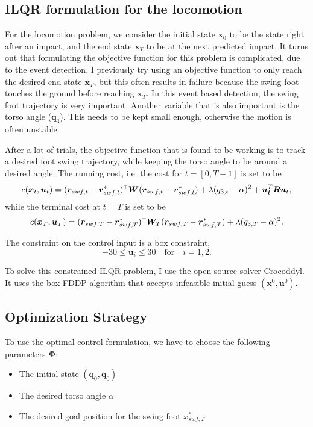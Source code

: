 \subsection{ILQR formulation for the locomotion}
For the locomotion problem, we consider the initial state $\bm{x}_0$ to be the state right after an impact, and the end state $\bm{x}_T$ to be at the next predicted impact. It turns out that formulating the objective function for this problem is complicated, due to the event detection. I previously try using an objective function to only reach the desired end state $\bm{x}_T$, but this often results in failure because the swing foot touches the ground before reaching $\bm{x}_T$. In this event based detection, the swing foot trajectory is very important. Another variable that is also important is the torso angle ($\bm{q}_3$). This needs to be kept small enough, otherwise the motion is often unstable. 

After a lot of trials, the objective function that is found to be working is to track a desired foot swing trajectory, while keeping the torso angle to be around a desired angle. The running cost, i.e. the cost for $t = [0, T-1] $ is set to be
\begin{equation}
c(\bm{x}_t, \bm{u}_t) = (\bm{r}_{swf, t} - \bm{r}_{swf, t}^*)^{\scriptscriptstyle\top} \bm{W} (\bm{r}_{swf,t} - \bm{r}_{swf, t}^*) + \lambda (q_{3,t} - \alpha)^2 +  \bm{u_t}^T \bm{R} \bm{u}_t,
\end{equation}
while the terminal cost at $t = T$ is set to be 
\begin{equation}
c(\bm{x}_T, \bm{u}_T) = (\bm{r}_{swf, T} - \bm{r}_{swf, T}^*)^{\scriptscriptstyle\top} \bm{W}_T (\bm{r}_{swf, T} - \bm{r}_{swf, T}^*) + \lambda (q_{3,T} - \alpha)^2.
\end{equation}

The constraint on the control input is a box constraint, 
\begin{equation}
-30 \leq \bm{u}_i \leq 30 \quad \text{for} \quad  i = 1, 2 . 
\end{equation}

To solve this constrained ILQR problem, I use the open source solver Crocoddyl. It uses the box-FDDP algorithm that accepts infeasible initial guess $(\bm{x}^0, \bm{u}^0)$. 

\subsection{Optimization Strategy}
\label{sec:opt_strat}

To use the optimal control formulation, we have to choose the following parameters $\bm{\Phi}$:
\begin{itemize}
\item The initial state $(\bm{q}_0, \dot{\bm{q}_0})$
\item The desired torso angle $\alpha$
\item The desired goal position for the swing foot $x_{swf,T}^*$
\end{itemize}

